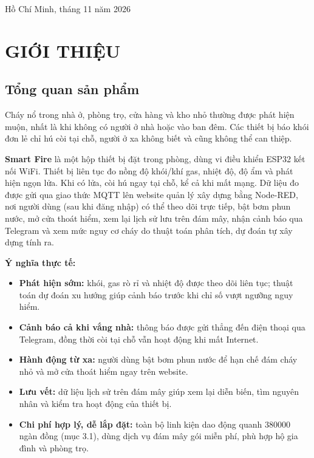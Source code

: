 \documentclass[12pt,a4paper]{article}
\begin{document}
\begin{titlepage}
\vfill
{\large Hồ Chí Minh, tháng 11 năm 2026\par}
\vspace*{0.3cm}
\end{titlepage}

\setcounter{page}{1}

\section{GIỚI THIỆU}

\subsection{Tổng quan sản phẩm}

Cháy nổ trong nhà ở, phòng trọ, cửa hàng và kho nhỏ thường được phát hiện muộn, nhất là khi không có người ở nhà hoặc vào ban đêm. Các thiết bị báo khói đơn lẻ chỉ hú còi tại chỗ, người ở xa không biết và cũng không thể can thiệp.

\textbf{Smart Fire} là một hộp thiết bị đặt trong phòng, dùng vi điều khiển ESP32 kết nối WiFi. Thiết bị liên tục đo nồng độ khói/khí gas, nhiệt độ, độ ẩm và phát hiện ngọn lửa. Khi có lửa, còi hú ngay tại chỗ, kể cả khi mất mạng. Dữ liệu đo được gửi qua giao thức MQTT lên website quản lý xây dựng bằng Node-RED, nơi người dùng (sau khi đăng nhập) có thể theo dõi trực tiếp, bật bơm phun nước, mở cửa thoát hiểm, xem lại lịch sử lưu trên đám mây, nhận cảnh báo qua Telegram và xem mức nguy cơ cháy do thuật toán phân tích, dự đoán tự xây dựng tính ra.

\textbf{Ý nghĩa thực tế:}
\begin{itemize}
  \item \textbf{Phát hiện sớm: }khói, gas rò rỉ và nhiệt độ được theo dõi liên tục; thuật toán dự đoán xu hướng giúp cảnh báo trước khi chỉ số vượt ngưỡng nguy hiểm.
  \item \textbf{Cảnh báo cả khi vắng nhà: }thông báo được gửi thẳng đến điện thoại qua Telegram, đồng thời còi tại chỗ vẫn hoạt động khi mất Internet.
  \item \textbf{Hành động từ xa: }người dùng bật bơm phun nước để hạn chế đám cháy nhỏ và mở cửa thoát hiểm ngay trên website.
  \item \textbf{Lưu vết: }dữ liệu lịch sử trên đám mây giúp xem lại diễn biến, tìm nguyên nhân và kiểm tra hoạt động của thiết bị.
  \item \textbf{Chi phí hợp lý, dễ lắp đặt: }toàn bộ linh kiện dao động quanh 380000 ngàn đồng (mục 3.1), dùng dịch vụ đám mây gói miễn phí, phù hợp hộ gia đình và phòng trọ.
\end{itemize}
\end{document}
